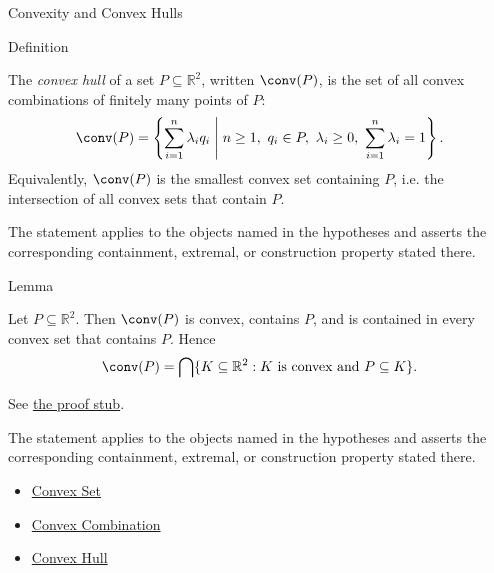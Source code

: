 \begin{topicbox}{Convexity and Convex Hulls}
\NoLocalDependencies

\begin{definitionbox}{Definition}
\begin{definition}
\label{def:computational-geometry-convex-hull}
The \emph{convex hull} of a set \(P\subseteq\mathbb{R}^2\), written
\(\conv(P)\), is the set of all convex combinations of finitely many points of
\(P\):
\[
  \conv(P)
  =
  \left\{
    \sum_{i=1}^{n}\lambda_i q_i
    \;\middle|\;
    n\ge 1,\ q_i\in P,\ \lambda_i\ge 0,\ \sum_{i=1}^{n}\lambda_i=1
  \right\}.
\]
Equivalently, \(\conv(P)\) is the smallest convex set containing \(P\), i.e. the
intersection of all convex sets that contain \(P\).
\end{definition}
\end{definitionbox}

\begin{remark*}
The statement applies to the objects named in the hypotheses and asserts the
corresponding containment, extremal, or construction property stated there.
\end{remark*}

\NoLocalDependencies

\begin{lemmabox}{Lemma}
\begin{lemma}
\label{lem:computational-geometry-convex-hull-smallest-convex-set}
Let \(P\subseteq\mathbb{R}^2\). Then \(\conv(P)\) is convex, contains \(P\), and
is contained in every convex set that contains \(P\). Hence
\[
  \conv(P)
  =
  \bigcap\{K\subseteq\mathbb{R}^2 : K\text{ is convex and }P\subseteq K\}.
\]
\end{lemma}
\end{lemmabox}

\begin{remark*}[Proof]
See
\hyperref[prf:computational-geometry-convex-hull-smallest-convex-set]{the proof stub}.
\end{remark*}

\begin{remark*}
The statement applies to the objects named in the hypotheses and asserts the
corresponding containment, extremal, or construction property stated there.
\end{remark*}

\begin{dependencies}
\begin{itemize}
  \item \hyperref[def:computational-geometry-convex-set]{Convex Set}
  \item \hyperref[def:computational-geometry-convex-combination]{Convex Combination}
  \item \hyperref[def:computational-geometry-convex-hull]{Convex Hull}
\end{itemize}
\end{dependencies}
\end{topicbox}


